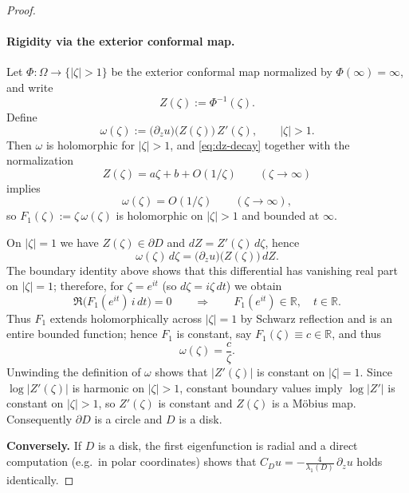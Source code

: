 \documentclass[10pt,a4paper]{amsart}
\newcommand{\R}{\mathbb{R}}
\begin{document}
\begin{proof}
\paragraph{Rigidity via the exterior conformal map.}
Let $\Phi:\Omega\to\{|\zeta|>1\}$ be the exterior conformal map normalized by $\Phi(\infty)=\infty$,
and write
\[
Z(\zeta):=\Phi^{-1}(\zeta).
\]
Define
\[
\omega(\zeta):=\bigl(\partial_z u\bigr)\bigl(Z(\zeta)\bigr)\,Z'(\zeta),
\qquad |\zeta|>1.
\]
Then $\omega$ is holomorphic for $|\zeta|>1$, and \eqref{eq:dz-decay} together with the normalization
\[
Z(\zeta)=a\zeta+b+O(1/\zeta)\qquad (\zeta\to\infty)
\]
implies
\[
\omega(\zeta)=O(1/\zeta)\qquad (\zeta\to\infty),
\]
so $F_1(\zeta):=\zeta\,\omega(\zeta)$ is holomorphic on $|\zeta|>1$ and bounded at $\infty$.

On $|\zeta|=1$ we have $Z(\zeta)\in\partial D$ and $dZ=Z'(\zeta)\,d\zeta$, hence
\[
\omega(\zeta)\,d\zeta
=\bigl(\partial_z u\bigr)\bigl(Z(\zeta)\bigr)\,dZ.
\]
The boundary identity above shows that this differential has vanishing real part on $|\zeta|=1$; therefore,
for $\zeta=e^{it}$ (so $d\zeta=i\zeta\,dt$) we obtain
\[
\Re\!\bigl(F_1(e^{it})\,i\,dt\bigr)=0
\qquad\Longrightarrow\qquad
F_1(e^{it})\in\R,\quad t\in\R.
\]
Thus $F_1$ extends holomorphically across $|\zeta|=1$ by Schwarz reflection and is an entire bounded
function; hence $F_1$ is constant, say $F_1(\zeta)\equiv c\in\R$, and thus
\[
\omega(\zeta)=\frac{c}{\zeta}.
\]
Unwinding the definition of $\omega$ shows that $|Z'(\zeta)|$ is constant on $|\zeta|=1$.
Since $\log|Z'(\zeta)|$ is harmonic on $|\zeta|>1$, constant boundary values imply $\log|Z'|$ is constant
on $|\zeta|>1$, so $Z'(\zeta)$ is constant and $Z(\zeta)$ is a M\"obius map. Consequently $\partial D$ is a circle
and $D$ is a disk.


\noindent\textbf{Conversely.}
If $D$ is a disk, the first eigenfunction is radial and a direct computation (e.g.\ in polar coordinates)
shows that $C_D u = -\frac{4}{\lambda_1(D)}\,\partial_z u$ holds identically.
\end{proof}
\end{document}
